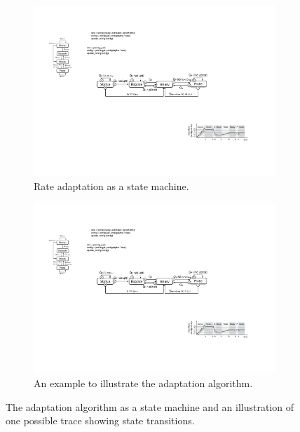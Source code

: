 \begin{figure}
  \begin{subfigure}[t]{\columnwidth}
    \centering
    \includegraphics[width=\columnwidth]{figures/cc.pdf}
    \caption{Rate adaptation as a state machine.}
    \vspace{1em}
    \label{fig:cc-sm}
  \end{subfigure}
  \begin{subfigure}[t]{0.95\columnwidth}
    \centering
    \includegraphics[width=\columnwidth]{figures/cc2.pdf}
    \caption{An example to illustrate the adaptation algorithm.}
    \label{fig:cc-ex}
  \end{subfigure}

  \caption{The adaptation algorithm as a state machine and an illustration of
    one possible trace showing state transitions.}
  \label{fig:cc}
\end{figure}

